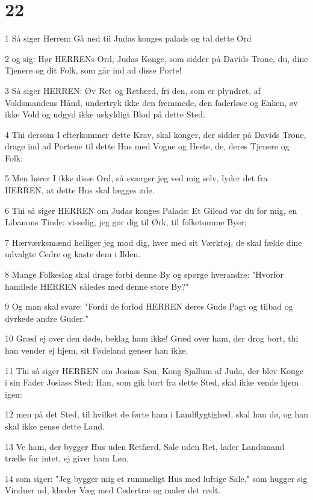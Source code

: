 \chapter{22}

\par 1 Så siger Herren: Gå ned til Judas konges palads og tal dette Ord
\par 2 og sig: Hør HERRENs Ord, Judas Konge, som sidder på Davids Trone, du, dine Tjenere og dit Folk, som går ind ad disse Porte!
\par 3 Så siger HERREN: Øv Ret og Retfærd, fri den, som er plyndret, af Voldsmandens Hånd, undertryk ikke den fremmede, den faderløse og Enken, øv ikke Vold og udgyd ikke uskyldigt Blod på dette Sted.
\par 4 Thi dersom I efterkommer dette Krav, skal konger, der sidder på Davids Trone, drage ind ad Portene til dette Hus med Vogne og Heste, de, deres Tjenere og Folk:
\par 5 Men hører I ikke disse Ord, så sværger jeg ved mig selv, lyder det fra HERREN, at dette Hus skal lægges øde.
\par 6 Thi så siger HERREN om Judas konges Palads: Et Gilead var du for mig, en Libanons Tinde; visselig, jeg gør dig til Ørk, til folketomme Byer;
\par 7 Hærværksmænd helliger jeg mod dig, hver med sit Værktøj, de skal fælde dine udvalgte Cedre og kaste dem i Ilden.
\par 8 Mange Folkeslag skal drage forbi denne By og spørge hverandre: "Hvorfor handlede HERREN således med denne store By?"
\par 9 Og man skal svare: "Fordi de forlod HERREN deres Guds Pagt og tilbad og dyrkede andre Guder."
\par 10 Græd ej over den døde, beklag ham ikke! Græd over ham, der drog bort, thi han vender ej hjem, sit Fødeland genser han ikke.
\par 11 Thi så siger HERREN om Josiass Søn, Kong Sjallum af Juda, der blev Konge i sin Fader Josiass Sted: Han, som gik bort fra dette Sted, skal ikke vende hjem igen:
\par 12 men på det Sted, til hvilket de førte ham i Landflygtighed, skal han dø, og han skal ikke gense dette Land.
\par 13 Ve ham, der bygger Hus uden Retfærd, Sale uden Ret, lader Landsmand trælle for intet, ej giver ham Løn,
\par 14 som siger: "Jeg bygger mig et rummeligt Hus med luftige Sale," som hugger sig Vinduer ud, klæder Væg med Cedertræ og maler det rødt.
